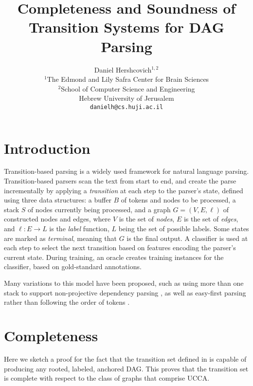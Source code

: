 \documentclass[11pt,a4paper]{article}
\title{Completeness and Soundness of Transition Systems for DAG Parsing}
\author{Daniel Hershcovich$^{1,2}$ \\
  $^1$The Edmond and Lily Safra Center for Brain Sciences \\
  $^2$School of Computer Science and Engineering \\
  Hebrew University of Jerusalem \\
  \texttt{danielh@cs.huji.ac.il}
}
\date{}
\begin{document}
\maketitle

\begin{abstract}
\end{abstract}


\section{Introduction}\label{sec:introduction}

Transition-based parsing is a widely used framework for natural language parsing.
Transition-based parsers scan the text from start to end,
and create the parse incrementally by applying a \textit{transition}
at each step to the parser's state,
defined using three data structures: a buffer $B$ of tokens and nodes to be processed,
a stack $S$ of nodes currently being processed,
and a graph $G=(V,E,\ell)$ of constructed nodes and edges,
where $V$ is the set of \emph{nodes}, $E$ is the set of \emph{edges},
and $\ell : E \to L$ is the \emph{label} function, $L$ being the set of possible labels.
Some states are marked as \textit{terminal}, meaning that $G$ is the final output.
A classifier is used at each step to select the next transition based on features
encoding the parser's current state.
During training, an oracle creates training instances for the classifier,
based on gold-standard annotations.

Many variations to this model have been proposed, such as using more than one stack to support
non-projective dependency parsing \cite{gomez2010a},
as well as easy-first parsing rather than following the order of tokens \cite{goldberg2010efficient}.


\section{Completeness}\label{sec:completeness}

Here we sketch a proof for the fact that the transition set defined in \cite{hershcovich2017a}
is capable of producing any rooted, labeled, anchored DAG.
This proves that the transition set is complete with respect to the class of graphs that
comprise UCCA.
\end{document}
